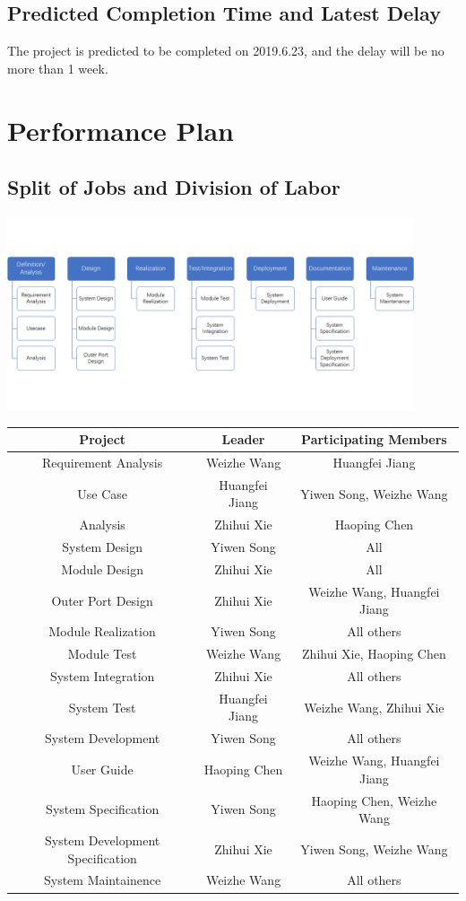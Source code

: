 \documentclass[10pt]{article}
\begin{document}
\subsection{Predicted Completion Time and Latest Delay}	
The project is predicted to be completed on 2019.6.23, and the delay will be no more than 1 week.

\section{Performance Plan}
\subsection{Split of Jobs and Division of Labor}

\begin{center}
	\includegraphics[width=12cm]{PP.png}

	\begin{tabular}{|c|c|c|} 
		\hline 
		\textbf{Project}&\textbf{Leader}&\textbf{Participating Members}\\
		\hline  
		Requirement Analysis&Weizhe Wang&Huangfei Jiang\\
		\hline 
		Use Case&Huangfei Jiang&Yiwen Song, Weizhe Wang\\
		\hline
		Analysis&Zhihui Xie&Haoping Chen\\
		\hline
		System Design&Yiwen Song&All\\
		\hline
		Module Design&Zhihui Xie&All\\
		\hline
		Outer Port Design&Zhihui Xie&Weizhe Wang, Huangfei Jiang\\
		\hline
		Module Realization&Yiwen Song&All others\\
		\hline
		Module Test&Weizhe Wang&Zhihui Xie, Haoping Chen\\
		\hline
		System Integration&Zhihui Xie&All others\\
		\hline
		System Test&Huangfei Jiang&Weizhe Wang, Zhihui Xie\\
		\hline
		System Development&Yiwen Song&All others\\
		\hline
		User Guide&Haoping Chen&Weizhe Wang, Huangfei Jiang\\
		\hline
		System Specification&Yiwen Song&Haoping Chen, Weizhe Wang\\
		\hline
		System Development Specification&Zhihui Xie&Yiwen Song, Weizhe Wang\\
		\hline
		System Maintainence&Weizhe Wang&All others\\
		\hline
	\end{tabular}    
\end{center}
\end{document}
